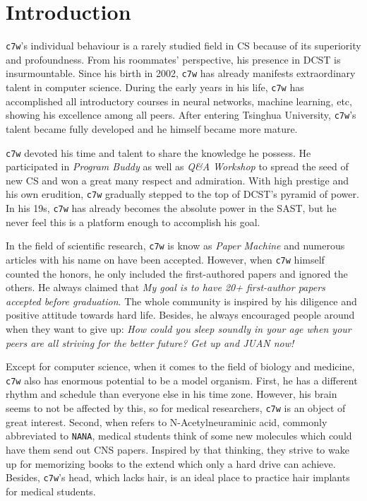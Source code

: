 \documentclass[10pt,twocolumn,letterpaper]{article}
\begin{document}
\section{Introduction}
\label{sec:intro}

\verb|c7w|'s individual behaviour is a rarely studied field in CS because of its superiority and profoundness. From his roommates' perspective, his presence in DCST is insurmountable. Since his birth in 2002, \verb|c7w| has already manifests extraordinary talent in computer science. During the early years in his life, \verb|c7w| has accomplished all introductory courses in neural networks, machine learning, etc, showing his excellence among all peers. After entering Tsinghua University, \verb|c7w|'s talent became fully developed and he himself became more mature.

\verb|c7w| devoted his time and talent to share the knowledge he possess. He participated in \emph{Program Buddy} as well as \emph{Q\&A Workshop} to spread the seed of new CS and won a great many respect and admiration. With high prestige and his own erudition, \verb|c7w| gradually stepped to the top of DCST's pyramid of power. In his 19s, \verb|c7w| has already becomes the absolute power in the SAST, but he never feel this is a platform enough to accomplish his goal.

In the field of scientific research, \verb|c7w| is know as \emph{Paper Machine} and numerous articles with his name on have been accepted. However, when \verb|c7w| himself counted the honors, he only included the first-authored papers and ignored the others. He always claimed that \emph{My goal is to have 20+ first-author papers accepted before graduation}. The whole community is inspired by his diligence and positive attitude towards hard life. Besides, he always encouraged people around when they want to give up: \emph{How could you sleep soundly in your age when your peers are all striving for the better future? Get up and JUAN now!}

Except for computer science, when it comes to the field of biology and medicine, \verb|c7w| also has enormous potential to be a model organism. First, he has a different rhythm and schedule than everyone else in his time zone. However, his brain seems to not be affected by this, so for medical researchers, \verb|c7w| is an object of great interest. Second, when refers to N-Acetylneuraminic acid, commonly abbreviated to \verb|NANA|, medical students think of some new molecules which could have them send out CNS papers. Inspired by that thinking, they strive to wake up for memorizing books to the extend which only a hard drive can achieve. Besides, \verb|c7w|'s head, which lacks hair, is an ideal place to practice hair implants for medical students.
\end{document}
